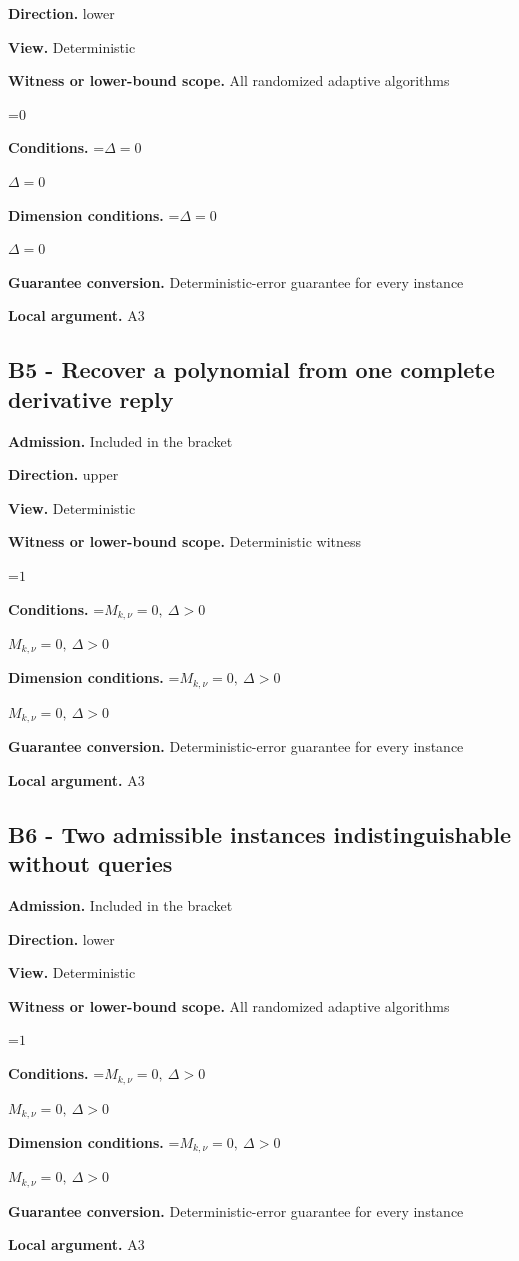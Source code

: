 \documentclass[10pt,a4paper]{article}
\newcommand{\AtlasMath}[1]{\par\begingroup\centering\setbox0=\hbox{$\displaystyle #1$}\ifdim\wd0>1.4\linewidth\typeout{ATLAS WIDE FORMULA: \the\wd0}\fi\ifdim\wd0>\linewidth\resizebox{\linewidth}{!}{\box0}\else\box0\fi\par\endgroup}
\newcommand{\AtlasInlineMath}[1]{\begingroup\setbox0=\hbox{$#1$}\ifdim\wd0>.4\linewidth\endgroup\AtlasMath{#1}\else\endgroup$#1$\fi}
\begin{document}
\textbf{Direction.} lower

\textbf{View.} Deterministic

\textbf{Witness or lower-bound scope.} All randomized adaptive algorithms

\AtlasMath{0}
\textbf{Conditions.} \AtlasInlineMath{\Delta=0}

\textbf{Dimension conditions.} \AtlasInlineMath{\Delta=0}

\textbf{Guarantee conversion.} Deterministic-error guarantee for every instance

\textbf{Local argument.} A3

\subsection{B5 - Recover a polynomial from one complete derivative reply}
\textbf{Admission.} Included in the bracket

\textbf{Direction.} upper

\textbf{View.} Deterministic

\textbf{Witness or lower-bound scope.} Deterministic witness

\AtlasMath{1}
\textbf{Conditions.} \AtlasInlineMath{M_{k,\nu}=0,\ \Delta>0}

\textbf{Dimension conditions.} \AtlasInlineMath{M_{k,\nu}=0,\ \Delta>0}

\textbf{Guarantee conversion.} Deterministic-error guarantee for every instance

\textbf{Local argument.} A3

\subsection{B6 - Two admissible instances indistinguishable without queries}
\textbf{Admission.} Included in the bracket

\textbf{Direction.} lower

\textbf{View.} Deterministic

\textbf{Witness or lower-bound scope.} All randomized adaptive algorithms

\AtlasMath{1}
\textbf{Conditions.} \AtlasInlineMath{M_{k,\nu}=0,\ \Delta>0}

\textbf{Dimension conditions.} \AtlasInlineMath{M_{k,\nu}=0,\ \Delta>0}

\textbf{Guarantee conversion.} Deterministic-error guarantee for every instance

\textbf{Local argument.} A3
\end{document}
